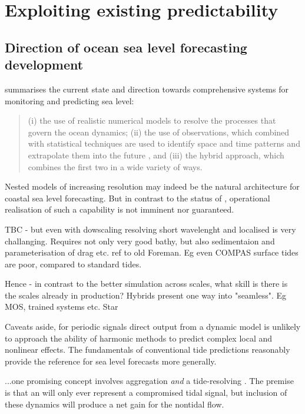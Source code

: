 \section{Exploiting existing predictability}
\label{S:fc_prospects}


\subsection{Direction of ocean sea level forecasting development}

\cite{10.3389/fmars.2019.00437} summarises the current state and direction towards comprehensive systems for monitoring and predicting sea level:
\begin{quote}
(i) the use of realistic numerical models to resolve the processes that govern the ocean dynamics; (ii) the use of observations, which combined with statistical techniques are used to identify space and time patterns and extrapolate them into the future , and (iii) the hybrid approach, which combines the first two in a wide variety of ways.
\end{quote} 

Nested models of increasing resolution may indeed be the natural architecture for coastal sea level forecasting.  
But in contrast to the status of \BL{}, operational realisation of such a capability is not imminent nor guaranteed.

TBC - but even with dowscaling resolving short wavelenght and localised is very challanging.
Requires not only very good bathy, but also sedimentaion and parameterisation of drag etc.
ref to old Foreman.
Eg even COMPAS surface tides are poor, compared to standard tides.

Hence - in contrast to the better simulation across scales, what skill is there is the scales already in production?
Hybrids present one way into "seamless".
Eg MOS, trained systems etc.
Star


Caveats aside, for periodic signals direct output from a dynamic model is unlikely to approach the ability of harmonic methods to predict complex local and nonlinear effects.   The fundamentals of conventional tide predictions reasonably provide the reference for sea level forecasts more generally.



...one promising concept involves aggregation \emph{and} a tide-resolving \OGCM{}.  The premise is that an \OGCM{} will only ever represent a compromised tidal signal, but inclusion of these dynamics will produce a net gain for the nontidal flow.



